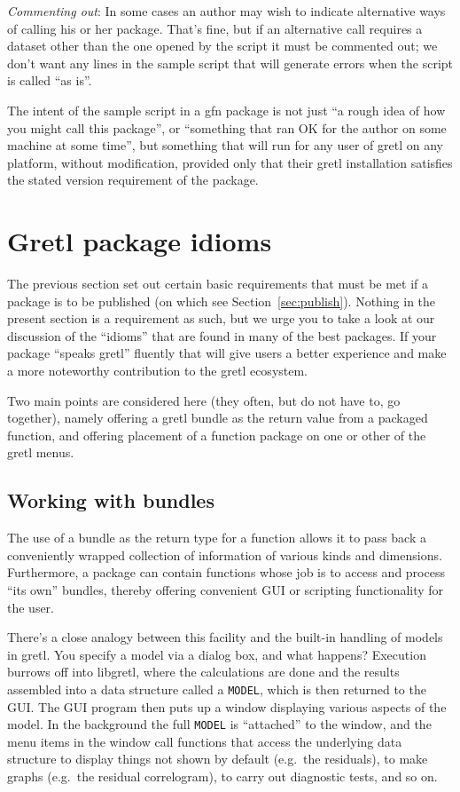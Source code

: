 \documentclass[oneside]{book}
\begin{document}
\vspace{1ex}
\textit{Commenting out}: In some cases an author may wish to
  indicate alternative ways of calling his or her package. That's
  fine, but if an alternative call requires a dataset other than
  the one opened by the script it must be commented out; we don't
  want any lines in the sample script that will generate errors
  when the script is called ``as is''.

\vspace{1ex}
The intent of the sample script in a gfn package is not just ``a rough
idea of how you might call this package'', or ``something that ran OK
for the author on some machine at some time'', but something that will
run for any user of gretl on any platform, without modification,
provided only that their gretl installation satisfies the stated
version requirement of the package.

\section{Gretl package idioms}
\label{sec:idioms}

The previous section set out certain basic requirements that must be
met if a package is to be published (on which see
Section~\ref{sec:publish}). Nothing in the present section is a
requirement as such, but we urge you to take a look at our discussion
of the ``idioms'' that are found in many of the best packages. If your
package ``speaks gretl'' fluently that will give users a better
experience and make a more noteworthy contribution to the gretl
ecosystem.

Two main points are considered here (they often, but do not have to,
go together), namely offering a gretl bundle as the return value from
a packaged function, and offering placement of a function package on
one or other of the gretl menus.

\subsection{Working with bundles}

The use of a bundle as the return type for a function allows it to
pass back a conveniently wrapped collection of information of various
kinds and dimensions. Furthermore, a package can contain functions
whose job is to access and process ``its own'' bundles, thereby
offering convenient GUI or scripting functionality for the user.

There's a close analogy between this facility and the built-in
handling of models in gretl. You specify a model via a dialog box, and
what happens? Execution burrows off into libgretl, where the
calculations are done and the results assembled into a data structure
called a \texttt{MODEL}, which is then returned to the GUI. The GUI
program then puts up a window displaying various aspects of the
model. In the background the full \texttt{MODEL} is ``attached'' to
the window, and the menu items in the window call functions that
access the underlying data structure to display things not shown by
default (e.g.\ the residuals), to make graphs (e.g.\ the residual
correlogram), to carry out diagnostic tests, and so on.
\end{document}
